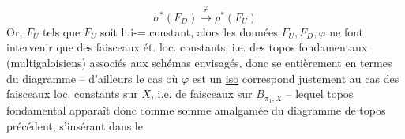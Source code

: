 \[
\boxed{\sigma^{*}(F_D)\xrightarrow{\varphi}\rho^{*}(F_U)}
\]
Or,   $F_U$ tels que $F_U$ soit
lui-=   constant, alors les données
$F_U,F_D,\varphi$ ne font intervenir que des
faisceaux ét. loc. constants, i.e. des
topos fondamentaux (multigaloisiens)
associés aux schémas envisagés,  donc
se  entièrement en termes du
diagramme
\margin{\unsure{(*)}}
-- d'ailleurs le cas où $\varphi$ est un \uline{iso} correspond
justement au cas des faisceaux loc. 
constants sur $X$, i.e. de faisceaux sur
$B_{\pi_1,X}$ -- lequel topos fondamental
apparaît donc comme somme
amalgamée du diagramme de topos
précédent, s'insérant dans le 

